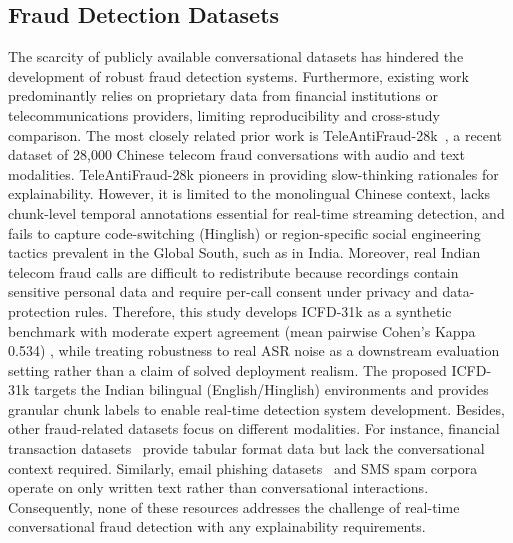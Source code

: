 \documentclass{article}
\newcommand{\crchange}[1]{{\color{blue}#1}}
\begin{document}
\subsection{Fraud Detection Datasets}
The scarcity of publicly available conversational datasets has hindered the development of robust fraud detection systems. Furthermore, existing work predominantly relies on proprietary data from financial institutions or telecommunications providers, limiting reproducibility and cross-study comparison. The most closely related prior work is TeleAntiFraud-28k~\cite{Ma2025}, a recent dataset of 28,000 Chinese telecom fraud conversations with audio and text modalities. TeleAntiFraud-28k pioneers in providing slow-thinking rationales for explainability. However, it is limited to the monolingual Chinese context, lacks chunk-level temporal annotations essential for real-time streaming detection, and fails to capture code-switching (Hinglish) or region-specific social engineering tactics prevalent in the Global South, such as in India.
\crchange{Moreover, real Indian telecom fraud calls are difficult to redistribute because recordings contain sensitive personal data and require per-call consent under privacy and data-protection rules. Therefore, this study develops ICFD-31k as a synthetic benchmark with moderate expert agreement (mean pairwise Cohen's Kappa 0.534) \cite{cohen1960coefficient}, while treating robustness to real ASR noise as a downstream evaluation setting rather than a claim of solved deployment realism.}
The proposed ICFD-31k targets the Indian bilingual (English/Hinglish) environments and provides granular chunk labels to enable real-time detection system development. Besides, other fraud-related datasets focus on different modalities. For instance, financial transaction datasets~\cite{dal2014learned} provide tabular format data but lack the conversational context required.  Similarly, email phishing datasets~\cite{fette2007learning} and SMS spam corpora~\cite{almeida2011contributions} operate on only written text rather than conversational interactions. Consequently, none of these resources addresses the challenge of real-time conversational fraud detection with any explainability requirements.
\end{document}
